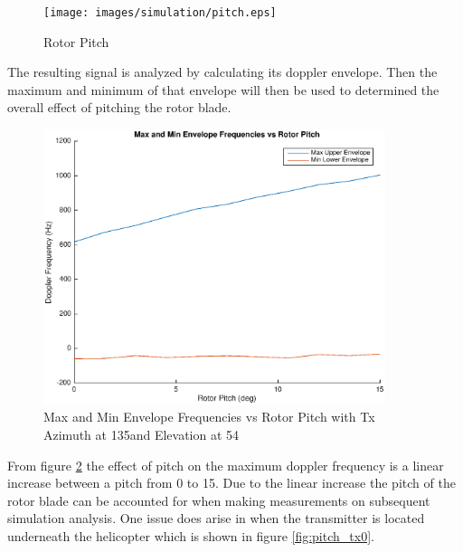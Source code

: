 \begin{figure}
	\begin{center}
		\texttt{[image: images/simulation/pitch.eps]}
		\caption{Rotor Pitch}
		\label{fig:blade_pitch}
	\end{center}
\end{figure}

The resulting signal is analyzed by calculating its doppler envelope. Then the maximum and minimum of that envelope will then be used to determined the overall effect of pitching the rotor blade. 

\begin{figure}
	\begin{center}
		\includegraphics[width=10cm]{images/simulation/pitch_max_doppler.eps}
		\caption{Max and Min Envelope Frequencies vs Rotor Pitch with Tx Azimuth at 135\textdegree \space and Elevation at 54\textdegree}
		\label{fig:pitch_15_135deg}
	\end{center}
\end{figure}

From figure \ref{fig:pitch_15_135deg} the effect of pitch on the maximum doppler frequency is a linear increase between a pitch from 0 \textdegree \space to 15\textdegree. Due to the linear increase the pitch of the rotor blade can be accounted for when making measurements on subsequent simulation analysis. One issue does arise in when the transmitter is located underneath the helicopter which is shown in figure \ref{fig:pitch_tx0}.

